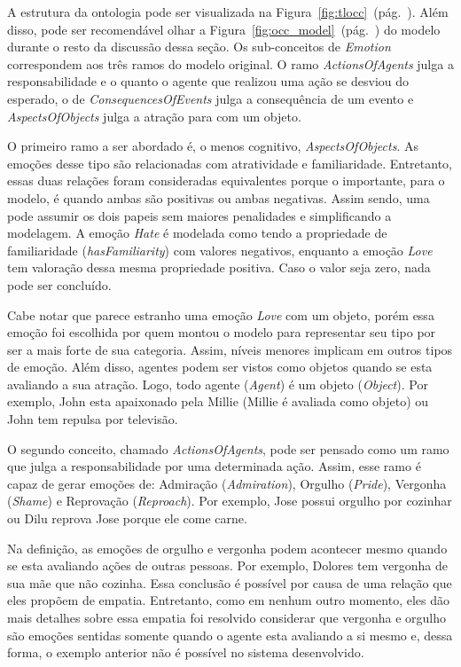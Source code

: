 A estrutura da ontologia pode ser visualizada na
Figura~\ref{fig:tlocc}~(pág.~\pageref{fig:tlocc}). Além disso, pode ser
recomendável olhar a
Figura~\ref{fig:occ_model}~(pág.~\pageref{fig:occ_model}) do modelo \occ
durante o resto da discussão dessa seção. Os sub-conceitos de \emph{Emotion}
correspondem aos três ramos do modelo original.
O ramo \emph{ActionsOfAgents} julga a responsabilidade e o quanto o agente que
realizou uma ação se desviou do esperado, o de
\emph{ConsequencesOfEvents} julga a consequência de um evento e
\emph{AspectsOfObjects} julga a atração para com um objeto.

O primeiro ramo a ser abordado é, o menos cognitivo, \emph{AspectsOfObjects}.
As emoções desse tipo são relacionadas com atratividade e familiaridade.
Entretanto, essas duas relações foram consideradas equivalentes porque o
importante, para o modelo, é quando ambas são positivas ou ambas negativas.
Assim sendo, uma pode assumir os dois papeis sem maiores penalidades e
simplificando a modelagem. A emoção \emph{Hate} é modelada como tendo a
propriedade de familiaridade (\emph{hasFamiliarity}) com valores negativos,
enquanto a emoção \emph{Love} tem valoração dessa mesma propriedade positiva.
Caso o valor seja zero, nada pode ser concluído.

Cabe notar que parece estranho uma emoção \emph{Love} com um objeto, porém
essa emoção foi escolhida por quem montou o modelo para representar seu tipo
por ser a mais forte de sua categoria. Assim, níveis menores implicam em
outros tipos de emoção. Além disso, agentes
podem ser vistos como objetos quando se esta avaliando a sua atração. Logo,
todo agente (\emph{Agent}) é um objeto (\emph{Object}). Por exemplo, John esta
apaixonado pela Millie (Millie é avaliada como objeto) ou John tem
repulsa por televisão.

O segundo conceito, chamado \emph{ActionsOfAgents}, pode ser pensado como
um ramo que julga a responsabilidade por uma determinada ação.
Assim, esse ramo é capaz de gerar emoções de: Admiração (\emph{Admiration}),
Orgulho (\emph{Pride}), Vergonha (\emph{Shame}) e Reprovação
(\emph{Reproach}). Por exemplo, Jose possui orgulho por cozinhar ou Dilu
reprova Jose porque ele come carne.

Na definição, as emoções de orgulho e vergonha podem acontecer mesmo quando se
esta avaliando ações de outras pessoas. Por exemplo, Dolores tem vergonha de
sua mãe que não cozinha. Essa conclusão é possível por causa de uma relação
que eles propõem de empatia\label{mark:empat}. Entretanto, como em nenhum outro momento, eles
dão mais detalhes sobre essa empatia foi resolvido considerar que vergonha e
orgulho são emoções sentidas somente quando o agente esta avaliando a si mesmo
e, dessa forma, o exemplo anterior não é possível no sistema desenvolvido. \dev{}

